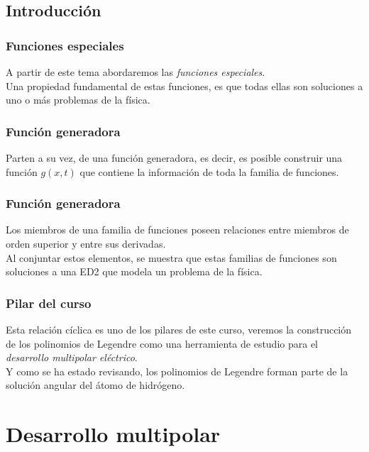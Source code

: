 \subsection{Introducción}
\begin{frame}
\frametitle{Funciones especiales}
A partir de este tema abordaremos las \emph{funciones especiales}.
\\
\bigskip
\pause
Una propiedad fundamental de estas funciones, es que todas ellas son soluciones a uno o más problemas de la física.
\end{frame}
\begin{frame}
\frametitle{Función generadora}
Parten a su vez, de una función generadora, es decir, es posible construir una función $g(x, t)$ que contiene la información de toda la familia de funciones.
\end{frame}
\begin{frame}
\frametitle{Función generadora}
Los miembros de una familia de funciones poseen relaciones entre miembros de orden superior y entre sus derivadas.
\\
\bigskip
\pause
Al conjuntar estos elementos, se muestra que estas familias de funciones son soluciones a una ED2 que modela un problema de la física.
\end{frame}
\begin{frame}
\frametitle{Pilar del curso}
Esta relación cíclica es uno de los pilares de este curso, veremos la construcción de los polinomios de Legendre como una herramienta de estudio para el \emph{desarrollo multipolar eléctrico}.
\\
\bigskip
\pause
Y como se ha estado revisando, los polinomios de Legendre forman parte de la solución angular del átomo de hidrógeno.
\end{frame}
\section{Desarrollo multipolar}
